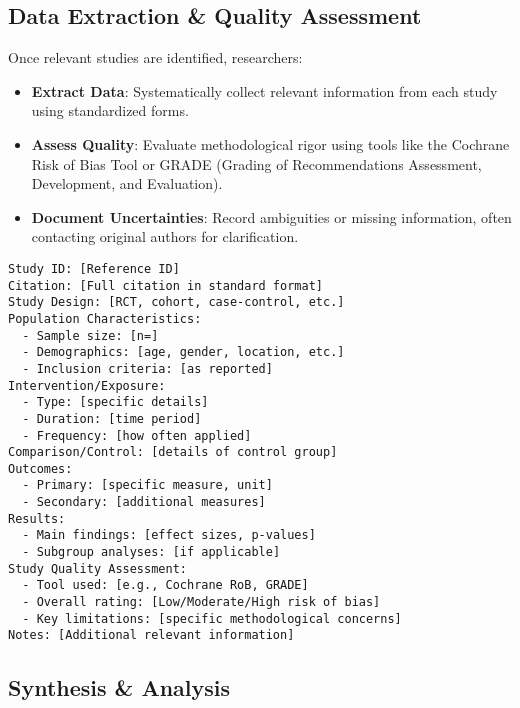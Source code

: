 \subsection{Data Extraction \& Quality Assessment}

Once relevant studies are identified, researchers:

\begin{itemize}
    \item \textbf{Extract Data}: Systematically collect relevant information from each study using standardized forms.
    \item \textbf{Assess Quality}: Evaluate methodological rigor using tools like the Cochrane Risk of Bias Tool or GRADE (Grading of Recommendations Assessment, Development, and Evaluation).
    \item \textbf{Document Uncertainties}: Record ambiguities or missing information, often contacting original authors for clarification.
\end{itemize}

\begin{configbox}
\begin{lstlisting}
Study ID: [Reference ID]
Citation: [Full citation in standard format]
Study Design: [RCT, cohort, case-control, etc.]
Population Characteristics:
  - Sample size: [n=]
  - Demographics: [age, gender, location, etc.]
  - Inclusion criteria: [as reported]
Intervention/Exposure:
  - Type: [specific details]
  - Duration: [time period]
  - Frequency: [how often applied]
Comparison/Control: [details of control group]
Outcomes:
  - Primary: [specific measure, unit]
  - Secondary: [additional measures]
Results:
  - Main findings: [effect sizes, p-values]
  - Subgroup analyses: [if applicable]
Study Quality Assessment:
  - Tool used: [e.g., Cochrane RoB, GRADE]
  - Overall rating: [Low/Moderate/High risk of bias]
  - Key limitations: [specific methodological concerns]
Notes: [Additional relevant information]
\end{lstlisting}
\end{configbox}


\subsection{Synthesis \& Analysis}

